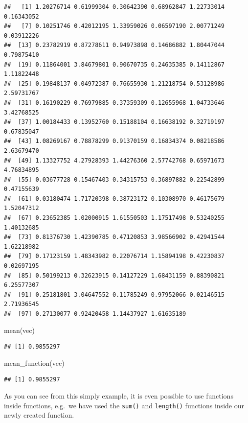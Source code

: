 \documentclass[
]{book}
\newenvironment{Shaded}{\begin{snugshade}}{\end{snugshade}}
\newcommand{\FunctionTok}[1]{\textcolor[rgb]{0.00,0.00,0.00}{#1}}
\newcommand{\NormalTok}[1]{#1}
\theoremstyle{definition}
\theoremstyle{definition}
\theoremstyle{definition}
\theoremstyle{definition}
\theoremstyle{remark}
\begin{document}
\begin{verbatim}
##   [1] 1.20276714 0.61999304 0.30642390 0.68962847 1.22733014 0.16343052
##   [7] 0.10251746 0.42012195 1.33959026 0.06597190 2.00771249 0.03912226
##  [13] 0.23782919 0.87278611 0.94973898 0.14686882 1.80447044 0.79875410
##  [19] 0.11864001 3.84679801 0.90670735 0.24635385 0.14112867 1.11822448
##  [25] 0.19848137 0.04972387 0.76655930 1.21218754 0.53128986 2.59731767
##  [31] 0.16190229 0.76979885 0.37359309 0.12655968 1.04733646 3.42768525
##  [37] 1.00184433 0.13952760 0.15188104 0.16638192 0.32719197 0.67835047
##  [43] 1.08269167 0.78878299 0.91370159 0.16834374 0.08218586 2.63679470
##  [49] 1.13327752 4.27928393 1.44276360 2.57742768 0.65971673 4.76834895
##  [55] 0.03677728 0.15467403 0.34315753 0.36897882 0.22542899 0.47155639
##  [61] 0.03180474 1.71720398 0.38723172 0.10308970 0.46175679 1.52047312
##  [67] 0.23652385 1.02000915 1.61550503 1.17517498 0.53240255 1.40132685
##  [73] 0.81376730 1.42390785 0.47120853 3.98566902 0.42941544 1.62218982
##  [79] 0.17123159 1.48343982 0.22076714 1.15894198 0.42230837 0.02697195
##  [85] 0.50199213 0.32623915 0.14127229 1.68431159 0.88390821 6.25577307
##  [91] 0.25181801 3.04647552 0.11785249 0.97952066 0.02146515 2.71936545
##  [97] 0.27130077 0.92420458 1.14437927 1.61635189
\end{verbatim}

\begin{Shaded}
\begin{Highlighting}[]
\FunctionTok{mean}\NormalTok{(vec)}
\end{Highlighting}
\end{Shaded}

\begin{verbatim}
## [1] 0.9855297
\end{verbatim}

\begin{Shaded}
\begin{Highlighting}[]
\FunctionTok{mean\_function}\NormalTok{(vec)}
\end{Highlighting}
\end{Shaded}

\begin{verbatim}
## [1] 0.9855297
\end{verbatim}

As you can see from this simply example, it is even possible to use functions inside functions, e.g.~we have used the \texttt{sum()} and \texttt{length()} functions inside our newly created function.
\end{document}
